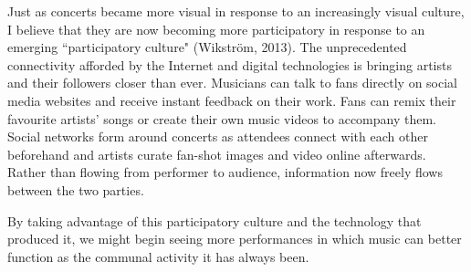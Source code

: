 Just as concerts became more visual in response to an increasingly visual culture, I believe that they are now becoming more participatory in response to an emerging ``participatory culture" (Wikstr\"{o}m, 2013). The unprecedented connectivity afforded by the Internet and digital technologies is bringing artists and their followers closer than ever. Musicians can talk to fans directly on social media websites and receive instant feedback on their work. Fans can remix their favourite artists' songs or create their own music videos to accompany them. Social networks form around concerts as attendees connect with each other beforehand and artists curate fan-shot images and video online afterwards. Rather than flowing from performer to audience, information now freely flows between the two parties.

By taking advantage of this participatory culture and the technology that produced it, we might begin seeing more performances in which music can better function as the communal activity it has always been.



